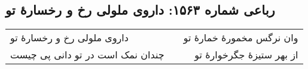 \begin{center}
\section*{رباعی شماره ۱۵۶۳: داروی ملولی رخ و رخسارهٔ تو}
\label{sec:1563}
\begin{longtable}{l p{0.5cm} r}
داروی ملولی رخ و رخسارهٔ تو
&&
وان نرگس مخمورهٔ خمارهٔ تو
\\
چندان نمک است در تو دانی پی چیست
&&
از بهر ستیزهٔ جگرخوارهٔ تو
\\
\end{longtable}
\end{center}
